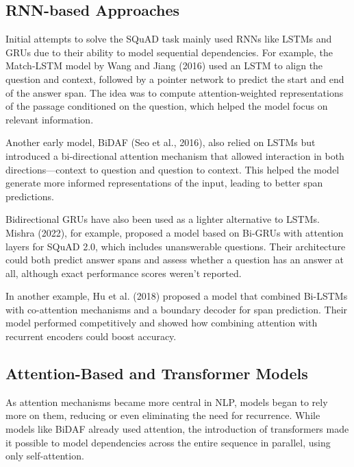 \documentclass[runningheads]{llncs}
\begin{document}
	\subsection{RNN-based Approaches}
    Initial attempts to solve the SQuAD task mainly used RNNs like LSTMs and GRUs due to their ability to model sequential dependencies. For example, the Match-LSTM model by Wang and Jiang (2016) used an LSTM to align the question and context, followed by a pointer network to predict the start and end of the answer span. The idea was to compute attention-weighted representations of the passage conditioned on the question, which helped the model focus on relevant information.
    \\
    \par

Another early model, BiDAF (Seo et al., 2016), also relied on LSTMs but introduced a bi-directional attention mechanism that allowed interaction in both directions—context to question and question to context. This helped the model generate more informed representations of the input, leading to better span predictions.
\\
\par

Bidirectional GRUs have also been used as a lighter alternative to LSTMs. Mishra (2022), for example, proposed a model based on Bi-GRUs with attention layers for SQuAD 2.0, which includes unanswerable questions. Their architecture could both predict answer spans and assess whether a question has an answer at all, although exact performance scores weren’t reported.
\\
\par

In another example, Hu et al. (2018) proposed a model that combined Bi-LSTMs with co-attention mechanisms and a boundary decoder for span prediction. Their model performed competitively and showed how combining attention with recurrent encoders could boost accuracy.
\par
    \subsection{Attention-Based and Transformer Models}
    As attention mechanisms became more central in NLP, models began to rely more on them, reducing or even eliminating the need for recurrence. While models like BiDAF already used attention, the introduction of transformers made it possible to model dependencies across the entire sequence in parallel, using only self-attention.
    \\
	\par
\end{document}

